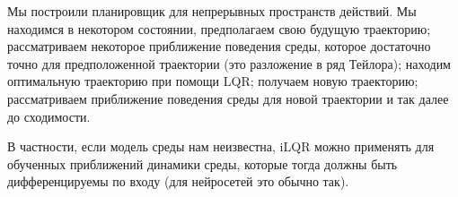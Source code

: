 Мы построили планировщик для непрерывных пространств действий. Мы находимся в некотором состоянии, предполагаем свою будущую траекторию; рассматриваем некоторое приближение поведения среды, которое достаточно точно для предположенной траектории (это разложение в ряд Тейлора); находим оптимальную траекторию при помощи LQR; получаем новую траекторию; рассматриваем приближение поведения среды для новой траектории и так далее до сходимости.

В частности, если модель среды нам неизвестна, iLQR можно применять для обученных приближений динамики среды, которые тогда должны быть дифференцируемы по входу (для нейросетей это обычно так).